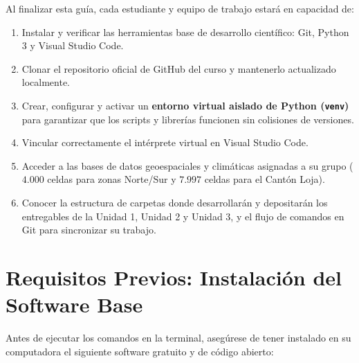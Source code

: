 \documentclass[11pt,a4paper]{article}
\begin{document}
\begin{conceptbox}[title=Objetivos de Aprendizaje Operativo]
Al finalizar esta guía, cada estudiante y equipo de trabajo estará en capacidad de:
\begin{enumerate}[leftmargin=*,itemsep=1.5pt]
  \item Instalar y verificar las herramientas base de desarrollo científico: Git, Python 3 y Visual Studio Code.
  \item Clonar el repositorio oficial de GitHub del curso y mantenerlo actualizado localmente.
  \item Crear, configurar y activar un \textbf{entorno virtual aislado de Python (\texttt{venv})} para garantizar que los scripts y librerías funcionen sin colisiones de versiones.
  \item Vincular correctamente el intérprete virtual en Visual Studio Code.
  \item Acceder a las bases de datos geoespaciales y climáticas asignadas a su grupo ($4.000$ celdas para zonas Norte/Sur y $7.997$ celdas para el Cantón Loja).
  \item Conocer la estructura de carpetas donde desarrollarán y depositarán los entregables de la Unidad 1, Unidad 2 y Unidad 3, y el flujo de comandos en Git para sincronizar su trabajo.
\end{enumerate}
\end{conceptbox}

\section{Requisitos Previos: Instalación del Software Base}

Antes de ejecutar los comandos en la terminal, asegúrese de tener instalado en su computadora el siguiente software gratuito y de código abierto:
\end{document}

